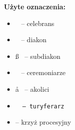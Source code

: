 \thispagestyle{empty}

\begin{center}
	\vspace*{2cm}


	\vspace{\fill}

	{\large \textbf{Użyte oznaczenia:}} \\

	\vspace{0.1\textwidth}

	{\large\centering
		\begin{itemize}[leftmargin=.43\linewidth,rightmargin=.35\linewidth,label=]
			\item \ii~ -- celebrans
			\item \dd~ -- diakon
			\item \ss~ -- subdiakon
			\item \cc~ -- ceremoniarze
			\item \aa~ -- akolici
			\item \tt~ -- turyferarz
			\item {} -- krzyż procesyjny
		\end{itemize}
	}

	\vspace{\fill}

\end{center}

\newpage


